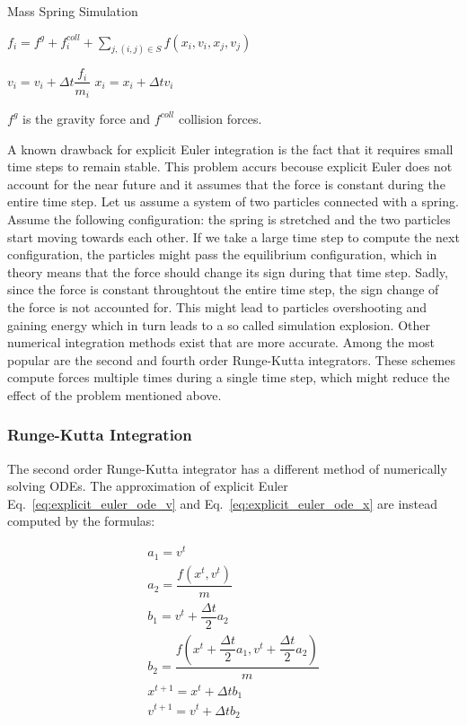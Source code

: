 \documentclass[en]{minipw} %
\begin{document}
\begin{algorithm}
\caption{Mass Spring Simulation}\label{euclid}
\begin{algorithmic}[1]
\State $f_i = f^{g} + f_{i}^{coll} + \sum_{j, (i,j) \in S} f(x_i, v_i, x_j, v_j)$
\EndFor

\State $v_{i} = v_{i} + \Delta t \dfrac{f_i}{m_i} $
\State $x_{i} = x_{i} + \Delta t v_i $
\EndFor

\EndWhile

\EndProcedure
\end{algorithmic}
\end{algorithm}

$f^{g}$ is the gravity force and $f^{coll}$ collision forces.

A known drawback for explicit Euler integration is the fact that it requires small time steps to remain stable. This problem accurs becouse explicit Euler does not account for the near future and it assumes that the force is constant during the entire time step. Let us assume a system of two particles connected with a spring. Assume the following configuration: the spring is stretched and the two particles start moving towards each other. If we take a large time step to compute the next configuration, the particles might pass the equilibrium configuration, which in theory means that the force should change its sign during that time step. Sadly, since the force is constant throughtout the entire time step, the sign change of the force is not accounted for. This might lead to particles overshooting and gaining energy which in turn leads to a so called simulation explosion.
Other numerical integration methods exist that are more accurate. Among the most popular are the second and fourth order Runge-Kutta integrators. These schemes compute forces multiple times during a single time step, which might reduce the effect of the problem mentioned above.

\subsubsection{Runge-Kutta Integration}
The second order Runge-Kutta integrator has a different method of numerically solving ODEs. The approximation of explicit Euler Eq.~\ref{eq:explicit_euler_ode_v} and Eq.~\ref{eq:explicit_euler_ode_x} are instead computed by the formulas:


\begin{equation}
\begin{aligned}
a_1 = v^t
\\
a_2 = \dfrac{f(x^t, v^t)}{m}
\\
b_1 = v^t + \dfrac{\Delta t}{2} a_2
\\
b_2 = \dfrac{f(x^t + \dfrac{\Delta t}{2} a_1, v^t + \dfrac{\Delta t}{2} a_2)}{m}
\\
x^{t+1} = x^{t} + \Delta t b_1
\\
v^{t+1} = v^{t} + \Delta t b_2
\end{aligned}
\end{equation}
\end{document}
